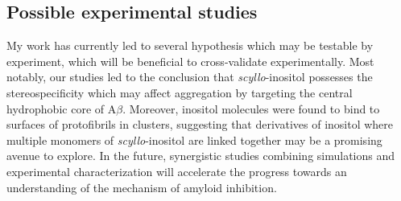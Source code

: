 \subsection{Possible experimental studies}
My work has currently led to several hypothesis which may be testable by experiment, which will be beneficial to cross-validate experimentally. Most notably, our studies led to the conclusion that \textit{scyllo}-inositol possesses the stereospecificity which may affect aggregation by targeting the central hydrophobic core of A$\beta$.  Moreover, inositol molecules were found to bind to surfaces of protofibrils in clusters, suggesting that derivatives of inositol where multiple monomers of \textit{scyllo}-inositol are linked together may be a promising avenue to explore. In the future, synergistic studies combining simulations and experimental characterization will accelerate the progress towards an understanding of the mechanism of amyloid inhibition.   





\begin{singlespace}


\end{singlespace}

